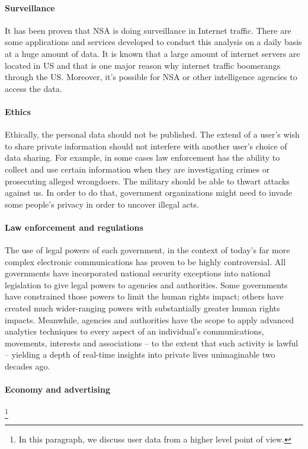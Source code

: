\paragraph{Surveillance}
It has been proven that NSA is doing surveillance in Internet traffic. There are
some applications and services developed to conduct this analysis on a daily 
basis at a huge amount of data. It is known that a large amount of internet 
servers are located in US and that is one major reason why internet traffic 
boomerangs through the US. Moreover, it's possible for NSA or other intelligence
agencies to access the data.

\paragraph{Ethics}
Ethically, the personal data should not be published. The extend of a user's 
wish to share private information should not interfere with another user's 
choice of data sharing.  For example, in some cases law enforcement has the 
ability to collect and use certain information when they are investigating 
crimes or prosecuting alleged wrongdoers. The military  should  be able to 
thwart attacks against us. In order to do that, government organizations might 
need to invade some people's privacy in order to uncover illegal acts. 

\paragraph{Law enforcement and regulations}
The use of legal powers of each government, in the context of today's far more 
complex electronic communications has proven to be highly controversial. 
All governments have incorporated national security exceptions into national 
legislation to give legal powers to agencies and authorities. Some governments 
have constrained those powers to limit the human rights impact; others have 
created much wider-ranging powers with substantially greater human rights 
impacts. Meanwhile, agencies and authorities have the scope to apply advanced 
analytics techniques to every aspect of an individual's communications, 
movements, interests and associations – to the extent that such activity is 
lawful – yielding a depth of real-time insights into private lives unimaginable 
two decades ago.

\paragraph{Economy and advertising}
\footnote{In this paragraph, we discuss user data from a higher level point of 
view.}

